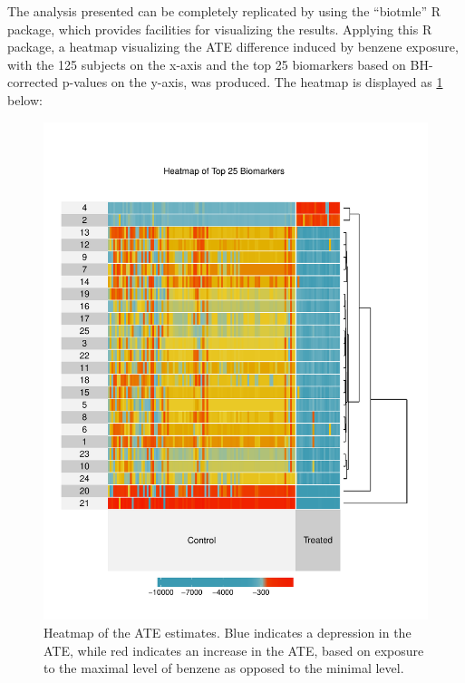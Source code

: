 The analysis presented can be completely replicated by using the ``biotmle'' R
package, which provides facilities for visualizing the results. Applying this
R package, a heatmap visualizing the ATE difference induced by benzene exposure,
with the 125 subjects on the x-axis and the top 25 biomarkers based on
BH-corrected p-values on the y-axis, was produced. The heatmap is displayed as
\ref{fig:heatmap} below:

\begin{figure}[H]
  \vspace{-8em}
  \label{fig:heatmap}
  \centering
  \includegraphics[scale=0.75]{figs/superheatmap.pdf}
  \caption{Heatmap of the ATE estimates. Blue indicates a depression in the
    ATE, while red indicates an increase in the ATE, based on exposure to the
    maximal level of benzene as opposed to the minimal level.}
\end{figure}

